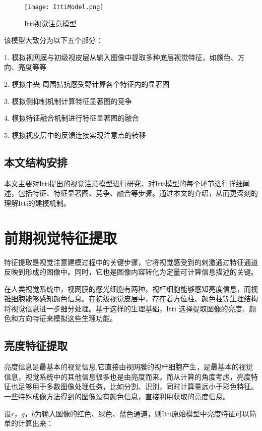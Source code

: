 \documentclass[a4paper,12pt]{article}
\begin{document}
\begin{figure}[!htb]
\centering
\texttt{[image: IttiModel.png]}
\caption{Itti视觉注意模型}\label{fig:1} 
\end{figure}


该模型大致分为以下五个部分：

1. 模拟视网膜与初级视皮层从输入图像中提取多种底层视觉特征，如颜色、方向、亮度等等


2. 模拟中央-周围拮抗感受野计算各个特征内的显著图


3. 模拟侧抑制机制计算特征显著图的竞争


4. 模拟特征融合机制进行特征显著图的融合


5. 模拟视皮层中的反馈连接实现注意点的转移


\subsection{本文结构安排}
本文主要对Itti提出的视觉注意模型进行研究，对Itti模型\cite{2:article}的每个环节进行详细阐述，包括特征、特征显著图、竞争、融合等步骤。通过本文的介绍，从而更深刻的理解Itti的建模机制。


\section{前期视觉特征提取}

特征提取是视觉注意建模过程中的关键步骤，它将视觉感受到的刺激通过特征通道反映到形成的图像中。同时，它也是图像内容转化为定量可计算信息描述的关键。

在人类视觉系统中，视网膜的感光细胞有两种，视杆细胞能够感知亮度信息，而视锥细胞能够感知颜色信息。在初级视觉皮层中，存在着方位柱、颜色柱等生理结构将视觉信息进一步细分处理。基于这样的生理基础，Itti 选择提取图像的亮度、颜色和方向特征来模拟这些生理功能。


\subsection{亮度特征提取}

亮度信息是最基本的视觉信息,它直接由视网膜的视杆细胞产生，是最基本的视觉信息，视觉系统中的其他信息很多也是由亮度而来。而从计算的角度考虑，亮度特征也足够用于多数图像处理任务，比如分割、识别，同时计算量远小于彩色特征。一些特殊成像方法得到的图像没有颜色信息，直接利用获取的亮度信息。


设$r$，$g$，$b$为输入图像的红色、绿色、蓝色通道，则Itti原始模型中亮度特征可以简单的计算出来：
\end{document}
